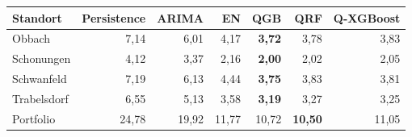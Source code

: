 \begin{tabular}{lrrrrrr}
\toprule
\textbf{Standort} & \textbf{Persistence} & \textbf{ARIMA} & \textbf{EN} & \textbf{QGB} & \textbf{QRF} & \textbf{Q-XGBoost} \\
\midrule
Obbach      & 7{,}14 & 6{,}01 & 4{,}17 & \textbf{3{,}72} & 3{,}78 & 3{,}83 \\
Schonungen  & 4{,}12 & 3{,}37 & 2{,}16 & \textbf{2{,}00} & 2{,}02 & 2{,}05 \\
Schwanfeld  & 7{,}19 & 6{,}13 & 4{,}44 & \textbf{3{,}75} & 3{,}83 & 3{,}81 \\
Trabelsdorf & 6{,}55 & 5{,}13 & 3{,}58 & \textbf{3{,}19} & 3{,}27 & 3{,}25 \\
\midrule
Portfolio   & 24{,}78 & 19{,}92 & 11{,}77 & 10{,}72 & \textbf{10{,}50} & 11{,}05 \\
\bottomrule
\end{tabular}
